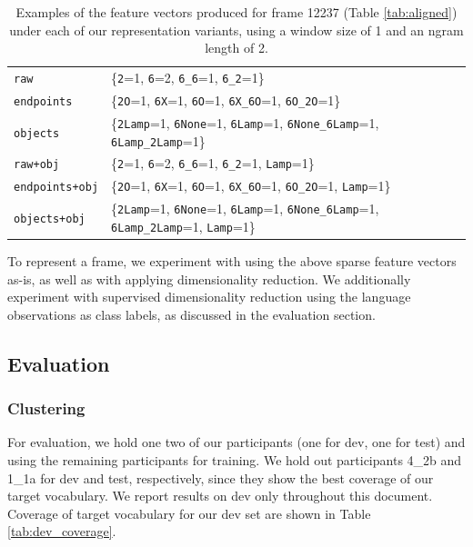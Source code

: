 \documentclass[11pt]{article}
\begin{document}
\begin{table}[ht!]
\centering
\begin{tabular}{|ll|}
\hline
\texttt{raw} & \{\texttt{2}=1, \texttt{6}=2, \texttt{6\_6}=1, \texttt{6\_2}=1\} \\
\texttt{endpoints} & \{\texttt{2O}=1, \texttt{6X}=1, \texttt{6O}=1, \texttt{6X\_6O}=1, \texttt{6O\_2O}=1\} \\
\texttt{objects} & \{\texttt{2Lamp}=1, \texttt{6None}=1, \texttt{6Lamp}=1, \texttt{6None\_6Lamp}=1, \texttt{6Lamp\_2Lamp}=1\} \\
\texttt{raw+obj} & \{\texttt{2}=1, \texttt{6}=2, \texttt{6\_6}=1, \texttt{6\_2}=1, \texttt{Lamp}=1\} \\
\texttt{endpoints+obj} & \{\texttt{2O}=1, \texttt{6X}=1, \texttt{6O}=1, \texttt{6X\_6O}=1, \texttt{6O\_2O}=1, \texttt{Lamp}=1\} \\
\texttt{objects+obj} & \{\texttt{2Lamp}=1, \texttt{6None}=1, \texttt{6Lamp}=1, \texttt{6None\_6Lamp}=1, \texttt{6Lamp\_2Lamp}=1, \texttt{Lamp}=1\} \\
\hline
\end{tabular}
\caption{Examples of the feature vectors produced for frame 12237 (Table \ref{tab:aligned}) under each of our representation variants, using a window size of 1 and an ngram length of 2.}
\label{tab:features}
\end{table}

To represent a frame, we experiment with using the above sparse feature vectors as-is, as well as with applying dimensionality reduction. We additionally experiment with supervised dimensionality reduction using the language observations as class labels, as discussed in the evaluation section. 

\subsection{Evaluation}

\subsubsection{Clustering}

For evaluation, we hold one two of our participants (one for dev, one for test) and using the remaining participants for training. We hold out participants 4\_2b and 1\_1a for dev and test, respectively, since they show the best coverage of our target vocabulary. We report results on dev only throughout this document. Coverage of target vocabulary for our dev set are shown in Table \ref{tab:dev_coverage}. 
\end{document}
